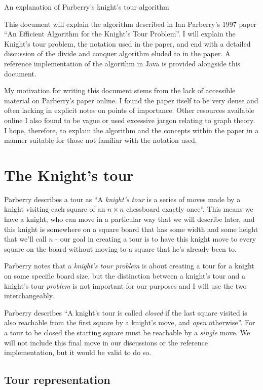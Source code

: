 \documentclass[11pt, a4paper]{article}
\begin{document}
{\centering\Large{An explanation of Parberry's knight's tour algorithm}}

This document will explain the algorithm described in Ian Parberry's 1997 paper ``An Efficient Algorithm for the Knight's Tour Problem''. I will explain the Knight's tour problem, the notation used in the paper, and end with a detailed discussion of the divide and conquer algorithm eluded to in the paper. A reference implementation of the algorithm in Java is provided alongside this document.

My motivation for writing this document stems from the lack of accessible material on Parberry's paper online. I found the paper itself to be very dense and often lacking in explicit notes on points of importance. Other resources available online I also found to be vague or used excessive jargon relating to graph theory. I hope, therefore, to explain the algorithm and the concepts within the paper in a manner suitable for those not familiar with the notation used.

\section{The Knight's tour}

Parberry describes a tour as ``A \emph{knight's tour} is a series of moves made by a knight visiting each square of an $n \times n$ chessboard exactly once''. This means we have a knight, who can move in a particular way that we will describe later, and this knight is somewhere on a square board that has some width and some height that we'll call $n$ - our goal in creating a tour is to have this knight move to every square on the board without moving to a square that he's already been to.

Parberry notes that a \emph{knight's tour problem} is about creating a tour for a knight on some specific board size, but the distinction between a knight's tour and a knight's tour \emph{problem} is not important for our purposes and I will use the two interchangeably.

Parberry describes ``A knight's tour is called \emph{closed} if the last square visited is also reachable from the first square by a knight's move, and \emph{open} otherwise''. For a tour to be closed the starting square must be reachable by a \emph{single} move. We will not include this final move in our discussions or the reference implementation, but it would be valid to do so.

\subsection{Tour representation}
\end{document}
